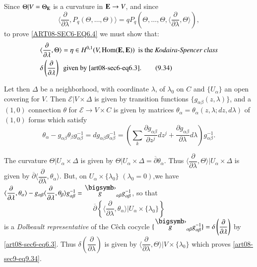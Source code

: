 Since $\Theta |V=\Theta_{\mathbf{E}}$ is a curvature in $\mathbf{E}\to V$, and since
$$
\langle \dfrac{\partial}{\partial\lambda}, P_{q}(\Theta,\ldots,\Theta)\rangle =qP_{q}(\Theta,\ldots,\Theta,\langle \dfrac{\partial}{\partial \lambda},\Theta\rangle ),
$$
to prove \eqref{ART08-SEC6-EQ6.4} we must show that:
\begin{align*}
& \langle\dfrac{\partial}{\partial\lambda},\Theta\rangle=\eta\in H^{0,1}(V,\operatorname{\mathrm{Hom}}(\mathbf{E},\mathbf{E}))\text{~ is the {\em Kodaira-Spencer class}}\\
& \delta\left(\dfrac{\partial}{\partial\lambda}\right)\text{~ given by \eqref{art08-sec6-eq6.3}}.\tag{9.34}\label{art08-sec9-eq9.34}
\end{align*}

Let then $\Delta$ be a neighborhood, with coordinate $\lambda$, of $\lambda_{0}$ on $C$ and $\{U_{\alpha}\}$ an open covering for $V$. Then $\mathcal{E}|V\times \Delta$ is given by transition functions $\{g_{\alpha\beta}(z,\lambda)\}$, and a $(1,0)$ connection $\theta$ for $\mathcal{E}\to V\times C$ is given by matrices $\theta_{\alpha}=\theta_{\alpha}(z,\lambda;dz,d\lambda)$ of $(1,0)$ forms which satisfy
\begin{equation*}
\theta_{\alpha}-g_{\alpha\beta}\theta_{\beta}g^{-1}_{\alpha\beta}=dg_{\alpha\beta}g^{-1}_{\alpha\beta}=\left(\sum\limits_{k}\dfrac{\partial g_{\alpha\beta}}{\partial z^{j}}dz^{j}+\dfrac{\partial g_{\alpha\beta}}{\partial \lambda}d\lambda\right)g^{-1}_{\alpha\beta}.\tag{9.35}\label{art08-sec9-eq9.35}
\end{equation*}

The curvature $\Theta|U_{\alpha}\times \Delta$ is given by $\Theta |U_{\alpha}\times \Delta=\overline{\partial}\theta_{\alpha}$. Thus $\langle \dfrac{\partial}{\partial\lambda},\Theta\rangle |U_{\alpha}\times \Delta$ is given by $\overline{\partial}\langle \dfrac{\partial}{\partial\lambda},\theta_{\alpha}\rangle$. But, on $U_{\alpha}\times \{\lambda_{0}\}$ $(\lambda_{0}=0)$,\pageoriginale we have $\langle \dfrac{\partial}{\partial\lambda},\theta_{\alpha}\rangle - g_{\alpha\beta}\langle \dfrac{\partial}{\partial\lambda},\theta_{\beta}\rangle g^{-1}_{\alpha\beta}=\overdot{g}_{\alpha\beta}g^{-1}_{\alpha\beta}$, so that 
$$
\overline{\partial}\left\{\langle \dfrac{\partial}{\partial\lambda}, \theta_{\alpha}\rangle | U_{\alpha}\times \{\lambda_{0}\}\right\}
$$ 
is a {\em Dolbeault representative} of the C\^ech cocycle $\{\overdot{g}_{\alpha\beta}g^{-1}_{\alpha\beta}\}=\delta\left(\dfrac{\partial}{\partial\lambda}\right)$ by \eqref{art08-sec6-eq6.3}. Thus $\delta\left(\dfrac{\partial}{\partial\lambda}\right)$ is given by $\langle \dfrac{\partial}{\partial\lambda},\Theta\rangle | V\times \{\lambda_{0}\}$ which proves \eqref{art08-sec9-eq9.34}.

